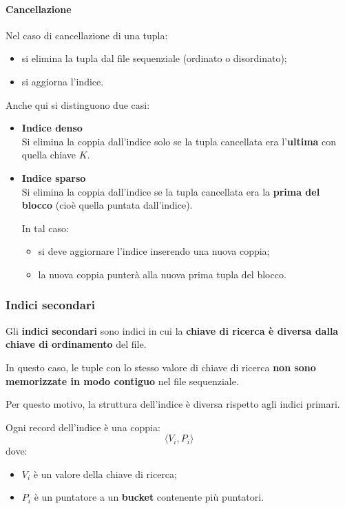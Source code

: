 \paragraph{Cancellazione}

Nel caso di cancellazione di una tupla:

\begin{itemize}
	\item si elimina la tupla dal file sequenziale (ordinato o disordinato);
	\item si aggiorna l'indice.
\end{itemize}

Anche qui si distinguono due casi:

\begin{itemize}
	\item \textbf{Indice denso} \\
	Si elimina la coppia dall'indice solo se la tupla cancellata era l'\textbf{ultima} con quella chiave $K$.
	
	\item \textbf{Indice sparso} \\
	Si elimina la coppia dall'indice se la tupla cancellata era la \textbf{prima del blocco} (cioè quella puntata dall'indice).
	
	In tal caso:
	\begin{itemize}
		\item si deve aggiornare l'indice inserendo una nuova coppia;
		\item la nuova coppia punterà alla nuova prima tupla del blocco.
	\end{itemize}
\end{itemize}
\subsubsection{Indici secondari}

Gli \textbf{indici secondari} sono indici in cui la \textbf{chiave di ricerca è diversa dalla chiave di ordinamento} del file.

In questo caso, le tuple con lo stesso valore di chiave di ricerca \textbf{non sono memorizzate in modo contiguo} nel file sequenziale.

Per questo motivo, la struttura dell'indice è diversa rispetto agli indici primari.

Ogni record dell'indice è una coppia:
\[
\langle V_i, P_i \rangle
\]
dove:
\begin{itemize}
	\item $V_i$ è un valore della chiave di ricerca;
	\item $P_i$ è un puntatore a un \textbf{bucket} contenente più puntatori.
\end{itemize}

